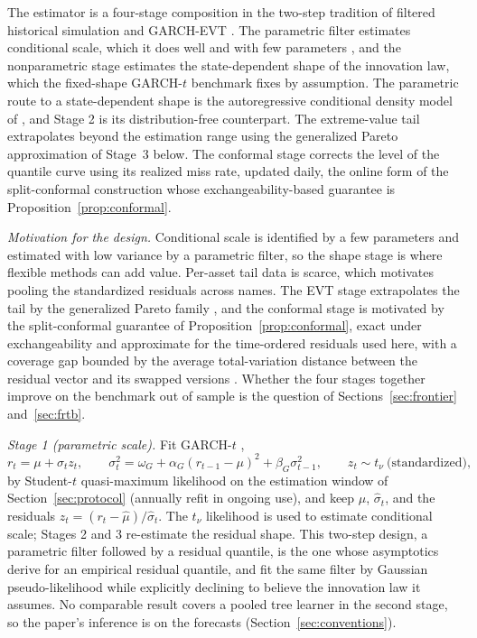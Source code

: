 \documentclass[11pt]{article}
\theoremstyle{remark}
\begin{document}
The estimator is a four-stage composition in the two-step tradition of filtered historical simulation and GARCH-EVT \citep{baroneadesi1999fhs, hullwhite1998, mcneilfrey2000}. The parametric
filter estimates conditional scale, which it does well and with few
parameters \citep{andersenbollerslev1998, hansenlunde2005}, and the nonparametric stage estimates the state-dependent
shape of the innovation law, which the fixed-shape GARCH-$t$ benchmark fixes by
assumption. The parametric route to a state-dependent shape is the autoregressive conditional density model of \citet{hansen1994ARCD}, and Stage 2 is its distribution-free counterpart. The extreme-value tail extrapolates beyond the estimation
range using the generalized Pareto approximation of Stage~3 below. The
conformal stage corrects the level of the quantile curve using its
realized miss rate, updated daily, the online form of the split-conformal
construction whose exchangeability-based guarantee is Proposition~\ref{prop:conformal}.

\noindent\emph{Motivation for the design.} Conditional scale is identified by a few parameters and estimated with low variance by a parametric filter, so the shape stage is where flexible methods can add value. Per-asset tail data is scarce, which motivates pooling the standardized residuals across names. The EVT stage extrapolates the
tail by the generalized Pareto family \citep{balkema1974,
pickands1975}, and the conformal stage is motivated by the
split-conformal guarantee of Proposition~\ref{prop:conformal}, exact
under exchangeability and approximate for the time-ordered residuals
used here, with a coverage gap bounded by the average total-variation distance between the residual vector and its swapped versions \citep{barber2023}. Whether the four stages together improve on the benchmark out of sample is the question of Sections~\ref{sec:frontier} and~\ref{sec:frtb}.

\emph{Stage 1 (parametric scale).} Fit GARCH-$t$ \citep{bollerslev1986, bollerslev1987},
\begin{equation}
r_t = \mu + \sigma_t z_t,\qquad
\sigma_t^2 = \omega_G + \alpha_G (r_{t-1}-\mu)^2 + \beta_G \sigma_{t-1}^2,
\qquad z_t \sim t_\nu \ \text{(standardized)},
\label{eq:garch}
\end{equation}
by Student-$t$ quasi-maximum likelihood on the estimation window of Section~\ref{sec:protocol} (annually refit in ongoing use), and keep
$\widehat{\mu}$, $\widehat{\sigma}_t$, and the residuals
$\widehat{z}_t = (r_t-\widehat{\mu})/\widehat{\sigma}_t$. The $t_\nu$ likelihood is used to estimate conditional scale; Stages 2 and 3 re-estimate the residual shape. This two-step design, a parametric filter followed by a residual quantile, is the one whose asymptotics \citet{francqzakoian2015} derive for an empirical residual quantile, and \citet{mcneilfrey2000} fit the same filter by Gaussian pseudo-likelihood while explicitly declining to believe the innovation law it assumes. No comparable result covers a pooled tree learner in the second stage, so the paper's inference is on the forecasts (Section~\ref{sec:conventions}).
\end{document}
